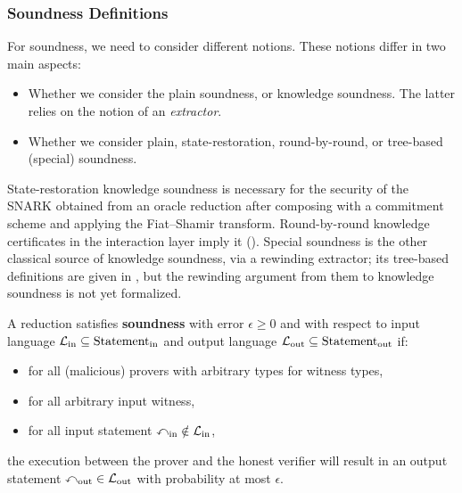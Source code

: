 \subsubsection{Soundness Definitions}

For soundness, we need to consider different notions. These notions differ in two main aspects:
\begin{itemize}
    \item Whether we consider the plain soundness, or knowledge soundness. The latter relies on the
    notion of an \emph{extractor}.
    \item Whether we consider plain, state-restoration, round-by-round, or tree-based (special)
    soundness.
\end{itemize}

State-restoration knowledge soundness is necessary for the security of the SNARK obtained from an
oracle reduction after composing with a commitment scheme and applying the Fiat--Shamir transform.
Round-by-round knowledge certificates in the interaction layer imply it
(). Special soundness is the other classical source of
knowledge soundness, via a rewinding extractor; its tree-based definitions are given in
, but the rewinding argument from them to knowledge soundness is
not yet formalized.

\begin{definition}[Soundness]
    \label{def:soundness}
    A reduction satisfies \textbf{soundness} with error \(\epsilon \geq 0\) and with respect to input
    language \(\mathcal{L}_{\mathrm{in}} \subseteq \text{Statement}_{\text{in}}\) and output language \(\mathcal{L}_{\mathrm{out}} \subseteq \text{Statement}_{\text{out}}\) if:
    \begin{itemize}
        \item for all (malicious) provers with arbitrary types for witness types,
        \item for all arbitrary input witness,
        \item for all input statement \(\mathbb{x}_{\text{in}} \notin \mathcal{L}_{\mathrm{in}}\),
    \end{itemize}
    the execution between the prover and the honest verifier will result in an output statement
    \(\mathbb{x}_{\text{out}} \in \mathcal{L}_{\mathrm{out}}\) with probability at most \(\epsilon\).
    \leanok
\end{definition}

